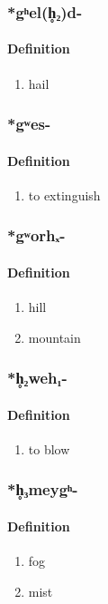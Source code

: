 \subsubsection{\**gʰel(h̥₂)d-}
\paragraph{Definition}
\begin{enumerate}
\item hail
\end{enumerate}
\subsubsection{\**gʷes-}
\paragraph{Definition}
\begin{enumerate}
\item to extinguish
\end{enumerate}
\subsubsection{\**gʷorhₓ-}
\paragraph{Definition}
\begin{enumerate}
\item hill
\item mountain
\end{enumerate}
\subsubsection{\**h̥₂weh₁-}
\paragraph{Definition}
\begin{enumerate}
\item to blow
\end{enumerate}
\subsubsection{\**h̥₃meygʰ-}
\paragraph{Definition}
\begin{enumerate}
\item fog
\item mist
\end{enumerate}
